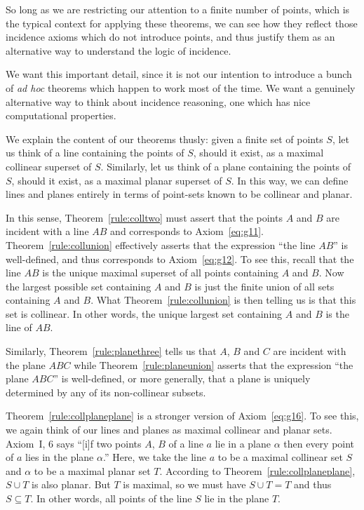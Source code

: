 So long as we are restricting our attention to a finite number of points, which is the typical context for applying these theorems, we can see how they reflect those incidence axioms which do not introduce points, and thus justify them as an alternative way to understand the logic of incidence. 

We want this important detail, since it is not our intention to introduce a bunch of \emph{ad hoc} theorems which happen to work most of the time. We want a genuinely alternative way to think about incidence reasoning, one which has nice computational properties.

We explain the content of our theorems thusly: given a finite set of points $S$, let us think of a line containing the points of $S$, should it exist, as a maximal collinear superset of $S$. Similarly, let us think of a plane containing the points of $S$, should it exist, as a maximal planar superset of $S$. In this way, we can define lines and planes entirely in terms of point-sets known to be collinear and planar.

In this sense, Theorem~\ref{rule:colltwo} must assert that the points $A$ and $B$ are incident with a line $AB$ and corresponds to Axiom~\ref{eq:g11}.  Theorem~\ref{rule:collunion} effectively asserts that the expression ``the line $AB$'' is well-defined, and thus corresponds to Axiom~\ref{eq:g12}. To see this, recall that the line $AB$ is the unique maximal superset of all points containing $A$ and $B$. Now the largest possible set containing $A$ and $B$ is just the finite union of all sets containing $A$ and $B$. What Theorem~\ref{rule:collunion} is then telling us is that this set is collinear. In other words, the unique largest set containing $A$ and $B$ is the line of $AB$.

Similarly, Theorem~\ref{rule:planethree} tells us that $A$, $B$ and $C$ are incident with the plane $ABC$ while Theorem~\ref{rule:planeunion} asserts that the expression ``the plane $ABC$'' is well-defined, or more generally, that a plane is uniquely determined by any of its non-collinear subsets.

Theorem~\ref{rule:collplaneplane} is a stronger version of Axiom~\ref{eq:g16}. To see this, we again think of our lines and planes as maximal collinear and planar sets. Axiom~I, 6 says ``[i]f two points $A$, $B$ of a line $a$ lie in a plane $\alpha$ then every point of $a$ lies in the plane $\alpha$.'' Here, we take the line $a$ to be a maximal collinear set $S$ and $\alpha$ to be a maximal planar set $T$. According to Theorem~\ref{rule:collplaneplane}, $S \cup T$ is also planar. But $T$ is maximal, so we must have $S \cup T = T$ and thus $S \subseteq T$. In other words, all points of the line $S$ lie in the plane $T$.

